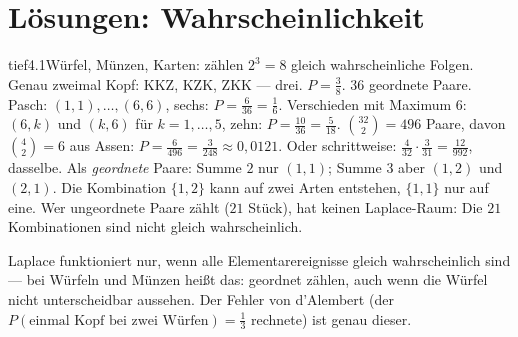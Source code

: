 \chapter{Lösungen: Wahrscheinlichkeit}

\begin{loesungkarte}{tief}{4.1}{Würfel, Münzen, Karten: zählen}
$2^{3} = 8$ gleich wahrscheinliche Folgen. Genau zweimal Kopf: KKZ, KZK, ZKK --- drei. $P = \frac38$.
$36$ geordnete Paare. Pasch: $(1, 1), \dots, (6, 6)$, sechs: $P = \frac6{36} = \frac16$. Verschieden mit Maximum $6$: $(6, k)$ und $(k, 6)$ für $k = 1, \dots, 5$, zehn: $P = \frac{10}{36} = \frac5{18}$.
$\binom{32}2 = 496$ Paare, davon $\binom42 = 6$ aus Assen: $P = \frac6{496} = \frac3{248}\approx0{,}0121$. Oder schrittweise: $\frac4{32}\cdot\frac3{31} = \frac{12}{992}$, dasselbe.
Als \emph{geordnete} Paare: Summe $2$ nur $(1, 1)$; Summe $3$ aber $(1, 2)$ und $(2, 1)$. Die Kombination $\{1, 2\}$ kann auf zwei Arten entstehen, $\{1, 1\}$ nur auf eine. Wer ungeordnete Paare zählt ($21$ Stück), hat keinen Laplace-Raum: Die $21$ Kombinationen sind nicht gleich wahrscheinlich.
\begin{mitnehmen}\kastentext
Laplace funktioniert nur, wenn alle Elementarereignisse gleich wahrscheinlich sind --- bei Würfeln und Münzen heißt das: geordnet zählen, auch wenn die Würfel nicht unterscheidbar aussehen. Der Fehler von d'Alembert (der $P(\text{einmal Kopf bei zwei Würfen}) = \frac13$ rechnete) ist genau dieser.
\end{mitnehmen}
\end{loesungkarte}

